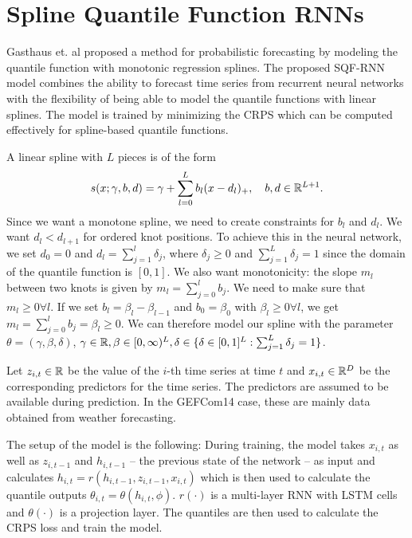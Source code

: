 \section{Spline Quantile Function RNNs}

Gasthaus et. al proposed a method for probabilistic forecasting by modeling 
the quantile function with monotonic regression splines. 
The proposed SQF-RNN model combines the ability to forecast time series 
from recurrent neural networks with the flexibility of being able to 
model the quantile functions with linear splines. 
The model is trained by minimizing the CRPS which can be computed effectively 
for spline-based quantile functions.

A linear spline with \(L\) pieces is of the form 
\[ s(x; \gamma, b, d) = \gamma + \sum_{l=0}^L b_l (x - d_l)_+, 
\quad b, d \in \mathbb{R}^{L+1}. \]
Since we want a monotone spline, we need to create constraints for \(b_l\) and \(d_l\).
We want \(d_l < d_{l+1}\) for ordered knot positions. To achieve this 
in the neural network, we set \(d_0 = 0\) and \(d_l = \sum_{j=1}^l \delta_j\), 
where \(\delta_j \geq 0\) and \(\sum_{j=1}^L \delta_j = 1\) since the domain 
of the quantile function is \([0, 1]\). 
We also want monotonicity: the slope \(m_l\) between two knots is given by 
\(m_l = \sum_{j=0}^l b_j\). We need to make sure that \(m_l \geq 0 \forall l\).
If we set \(b_l = \beta_l - \beta_{l-1}\) and \(b_0 = \beta_0\) with \(\beta_l \geq 0 \forall l\), 
we get \(m_l = \sum_{j=0}^l b_j = \beta_l \geq 0\).
We can therefore model our spline with the parameter 
\(\theta = (\gamma, \beta, \delta)\), \(\gamma \in \mathbb{R}, \beta \in [0,\infty)^{L}, 
\delta \in \{ \delta \in [0,1]^L: \sum_{j=1}^L \delta_j = 1 \}\).

Let \(z_{i,t} \in \mathbb{R}\) be the value of the \(i\)-th time series at time \(t\) and 
\(x_{i,t} \in \mathbb{R}^D\) be the corresponding predictors for the time series. 
The predictors are assumed to be available during prediction. In the 
GEFCom14 case, these are mainly data obtained from weather forecasting. 

The setup of the model is the following: 
During training, the model takes \(x_{i,t}\) as well as \(z_{i, t-1}\) 
and \(h_{i, t-1}\) -- the previous state of the network -- 
as input and calculates \(h_{i,t} = r(h_{i, t-1}, z_{i, t-1}, x_{i, t})\)
which is then used to calculate the quantile outputs 
\(\theta_{i,t} = \theta(h_{i,t}, \phi)\).
\(r(\cdot)\) is a multi-layer RNN with LSTM cells and \(\theta(\cdot)\) 
is a projection layer.
The quantiles are then used to calculate the CRPS loss and train the model.

